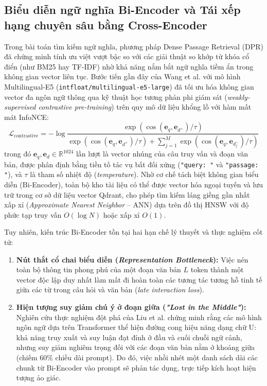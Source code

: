 ﻿\documentclass[12pt]{article}
\begin{document}
\subsection{Biểu diễn ngữ nghĩa Bi-Encoder và Tái xếp hạng chuyên sâu bằng Cross-Encoder}
Trong bài toán tìm kiếm ngữ nghĩa, phương pháp Dense Passage Retrieval (DPR) \cite{karpukhin2020dense} đã chứng minh tính ưu việt vượt bậc so với các giải thuật so khớp từ khóa cổ điển (như BM25 hay TF-IDF) nhờ khả năng nắm bắt ngữ nghĩa tiềm ẩn trong không gian vector liên tục. Bước tiến gần đây của Wang et al. \cite{wang2024e5} với mô hình Multilingual-E5 (\texttt{intfloat/multilingual-e5-large}) đã tối ưu hóa không gian vector đa ngôn ngữ thông qua kỹ thuật học tương phản phi giám sát (\textit{weakly-supervised contrastive pre-training}) trên quy mô dữ liệu khổng lồ với hàm mất mát InfoNCE:
\begin{equation}
    \mathcal{L}_{\text{contrastive}} = - \log \frac{\exp\left(\cos(\mathbf{e}_q, \mathbf{e}_{d^+}) / \tau\right)}{\exp\left(\cos(\mathbf{e}_q, \mathbf{e}_{d^+}) / \tau\right) + \sum_{j=1}^{M} \exp\left(\cos(\mathbf{e}_q, \mathbf{e}_{d^-_j}) / \tau\right)}
\end{equation}
trong đó $\mathbf{e}_q, \mathbf{e}_d \in \mathbb{R}^{1024}$ lần lượt là vector nhúng của câu truy vấn và đoạn văn bản, được phân định bằng tiền tố tác vụ bất đối xứng (\texttt{"query: "} và \texttt{"passage: "}), và $\tau$ là tham số nhiệt độ (\textit{temperature}). Nhờ cơ chế tách biệt không gian biểu diễn (Bi-Encoder), toàn bộ kho tài liệu có thể được vector hóa ngoại tuyến và lưu trữ trong cơ sở dữ liệu vector Qdrant, cho phép tìm kiếm láng giềng gần nhất xấp xỉ (\textit{Approximate Nearest Neighbor} -- ANN) dựa trên đồ thị HNSW với độ phức tạp truy vấn $O(\log N)$ hoặc xấp xỉ $O(1)$.

Tuy nhiên, kiến trúc Bi-Encoder tồn tại hai hạn chế lý thuyết và thực nghiệm cốt tử:
\begin{enumerate}
    \item \textbf{Nút thắt cổ chai biểu diễn (\textit{Representation Bottleneck}):} Việc nén toàn bộ thông tin phong phú của một đoạn văn bản $L$ token thành một vector độc lập duy nhất làm mất đi hoàn toàn các tương tác tương hỗ tinh tế giữa các từ trong câu hỏi và văn bản (\textit{late interaction loss}).
    \item \textbf{Hiện tượng suy giảm chú ý ở đoạn giữa (\textit{"Lost in the Middle"}):} Nghiên cứu thực nghiệm đột phá của Liu et al. \cite{liu2023lost} chứng minh rằng các mô hình ngôn ngữ dựa trên Transformer thể hiện đường cong hiệu năng dạng chữ U: khả năng truy xuất và suy luận đạt đỉnh ở đầu và cuối chuỗi ngữ cảnh, nhưng suy giảm nghiêm trọng đối với các đoạn văn bản nằm ở khoảng giữa (chiếm 60\% chiều dài prompt). Do đó, việc nhồi nhét một danh sách dài các chunk từ Bi-Encoder vào prompt sẽ phản tác dụng, trực tiếp kích hoạt hiện tượng ảo giác.
\end{enumerate}
\end{document}

